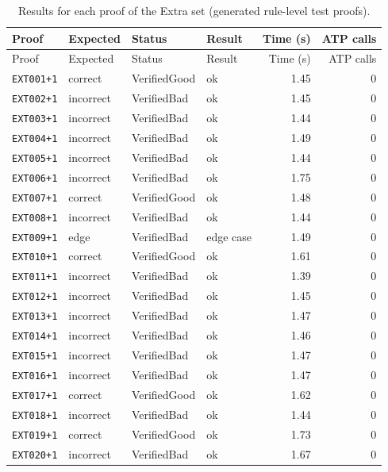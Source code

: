 \begin{longtable}{@{}l l l l r r@{}}
\caption{Results for each proof of the Extra set (generated rule-level test proofs).}\label{tab:app-ext}\\
\toprule
Proof & Expected & Status & Result & Time (s) & ATP calls \\
\midrule
\endfirsthead
\toprule
Proof & Expected & Status & Result & Time (s) & ATP calls \\
\midrule
\endhead
\bottomrule
\endlastfoot
\texttt{EXT001{+}1} & correct & VerifiedGood & ok & 1.45 & 0 \\
\texttt{EXT002{+}1} & incorrect & VerifiedBad & ok & 1.45 & 0 \\
\texttt{EXT003{+}1} & incorrect & VerifiedBad & ok & 1.44 & 0 \\
\texttt{EXT004{+}1} & incorrect & VerifiedBad & ok & 1.49 & 0 \\
\texttt{EXT005{+}1} & incorrect & VerifiedBad & ok & 1.44 & 0 \\
\texttt{EXT006{+}1} & incorrect & VerifiedBad & ok & 1.75 & 0 \\
\texttt{EXT007{+}1} & correct & VerifiedGood & ok & 1.48 & 0 \\
\texttt{EXT008{+}1} & incorrect & VerifiedBad & ok & 1.44 & 0 \\
\texttt{EXT009{+}1} & edge & VerifiedBad & edge case & 1.49 & 0 \\
\texttt{EXT010{+}1} & correct & VerifiedGood & ok & 1.61 & 0 \\
\texttt{EXT011{+}1} & incorrect & VerifiedBad & ok & 1.39 & 0 \\
\texttt{EXT012{+}1} & incorrect & VerifiedBad & ok & 1.45 & 0 \\
\texttt{EXT013{+}1} & incorrect & VerifiedBad & ok & 1.47 & 0 \\
\texttt{EXT014{+}1} & incorrect & VerifiedBad & ok & 1.46 & 0 \\
\texttt{EXT015{+}1} & incorrect & VerifiedBad & ok & 1.47 & 0 \\
\texttt{EXT016{+}1} & incorrect & VerifiedBad & ok & 1.47 & 0 \\
\texttt{EXT017{+}1} & correct & VerifiedGood & ok & 1.62 & 0 \\
\texttt{EXT018{+}1} & incorrect & VerifiedBad & ok & 1.44 & 0 \\
\texttt{EXT019{+}1} & correct & VerifiedGood & ok & 1.73 & 0 \\
\texttt{EXT020{+}1} & incorrect & VerifiedBad & ok & 1.67 & 0 \\

\end{longtable}
